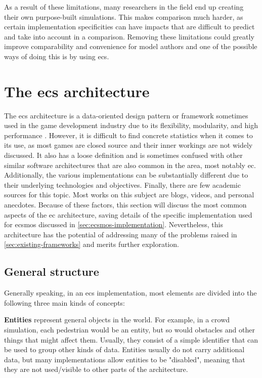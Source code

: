 \documentclass[twoside, 11pt]{article}
\begin{document}
As a result of these limitations, many researchers in the field end up creating their own purpose-built simulations. This makes comparison much harder, as certain implementation specificities can have impacts that are difficult to predict and take into account in a comparison. Removing these limitations could greatly improve comparability and convenience for model authors and one of the possible ways of doing this is by using \gls{ecs}.

\section{The \acrlong{ecs} architecture} \label{sec:ecs-architecture}

The \gls{ecs} architecture is a data-oriented design pattern or framework sometimes used in the game development industry due to its flexibility, modularity, and high performance \cite{ecs}. However, it is difficult to find concrete statistics when it comes to its use, as most games are closed source and their inner workings are not widely discussed. It also has a loose definition and is sometimes confused with other similar software architectures that are also common in the area, most notably \gls{ec}. Additionally, the various implementations can be substantially different due to their underlying technologies and objectives. Finally, there are few academic sources for this topic. Most works on this subject are blogs, videos, and personal anecdotes. Because of these factors, this section will discuss the most common aspects of the \gls{ec} architecture, saving details of the specific implementation used for \gls{ecsmos} discussed in \autoref{sec:ecsmos-implementation}. Nevertheless, this architecture has the potential of addressing many of the problems raised in \autoref{sec:existing-frameworks} and merits further exploration.

\subsection{General structure}

Generally speaking, in an \gls{ecs} implementation, most elements are divided into the following three main kinds of concepts: 

\textbf{Entities} represent general objects in the world. For example, in a crowd simulation, each pedestrian would be an entity, but so would obstacles and other things that might affect them. Usually, they consist of a simple identifier that can be used to group other kinds of data. Entities usually do not carry additional data, but many implementations allow entities to be "disabled", meaning that they are not used/visible to other parts of the architecture.
\end{document}
